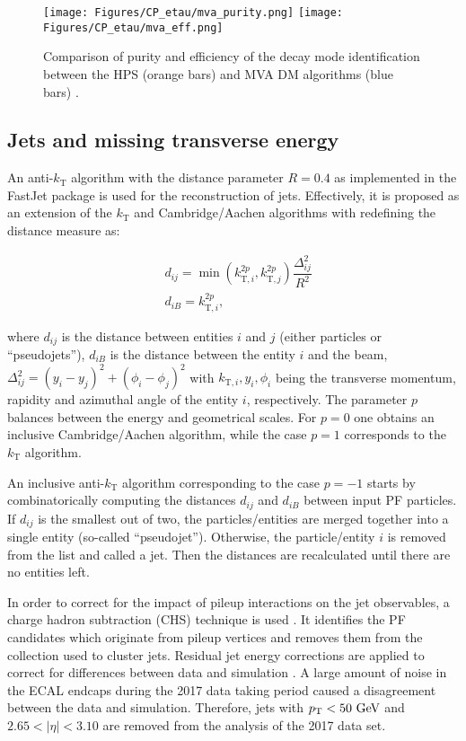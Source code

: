 \begin{figure}[t!]
    \centering
    \texttt{[image: Figures/CP\_etau/mva\_purity.png]}
    \texttt{[image: Figures/CP\_etau/mva\_eff.png]}
    \caption{Comparison of purity and efficiency of the \tauh decay mode identification between the HPS (orange bars) and MVA DM algorithms (blue bars) \cite{CMS-DP-2020-041}.}
    \label{fig:mva_dm}
\end{figure}



\subsection{Jets and missing transverse energy}\label{sec:jets}
An anti-$k_\text{T}$ algorithm \cite{Cacciari:2008gp} with the distance parameter $R=0.4$ as implemented in the FastJet package \cite{Cacciari:2011ma} is used for the reconstruction of jets. Effectively, it is proposed as an extension of the $k_\text{T}$ \cite{Ellis:1993tq} and Cambridge/Aachen \cite{Wobisch:1998wt} algorithms with redefining the distance measure as:

\begin{align}
    &d_{ij} = \min(k_{\text{T},i}^{2p},k_{\text{T},j}^{2p})\dfrac{\Delta^2_{ij}}{R^2}\\
    &d_{iB} = k_{\text{T},i}^{2p},
\end{align}

where $d_{ij}$ is the distance between entities $i$ and $j$ (either particles or \enquote{pseudojets}), $d_{iB}$ is the distance between the entity $i$ and the beam,  $\Delta^2_{ij} = (y_i-y_j)^2 + (\phi_i - \phi_j)^2$ with $k_{\text{T},i}, y_i, \phi_i$ being the transverse momentum, rapidity and azimuthal angle of the entity $i$, respectively. The parameter $p$ balances between the energy and geometrical scales. For $p=0$ one obtains an inclusive Cambridge/Aachen algorithm, while the case $p=1$ corresponds to the $k_\text{T}$ algorithm.

An inclusive anti-$k_\text{T}$ algorithm corresponding to the case $p=-1$ starts by combinatorically computing the distances $d_{ij}$ and $d_{iB}$ between input PF particles. If $d_{ij}$ is the smallest out of two, the particles/entities are merged together into a single entity (so-called \enquote{pseudojet}). Otherwise, the particle/entity $i$ is removed from the list and called a jet. Then the distances are recalculated until there are no entities left.

In order to correct for the impact of pileup interactions on the jet observables, a charge hadron subtraction (CHS) technique is used \cite{CMS-PAS-JME-14-001}. It identifies the PF candidates which originate from pileup vertices and removes them from the collection used to cluster jets. Residual jet energy corrections are applied to correct for differences between data and simulation \cite{CMS:2016lmd}. A large amount of noise in the ECAL endcaps during the 2017 data taking period caused a disagreement between the data and simulation. Therefore, jets with $p_{\text{T}} < 50~\text{GeV}$ and $2.65 < |\eta| < 3.10$ are removed from the analysis of the 2017 data set. 

